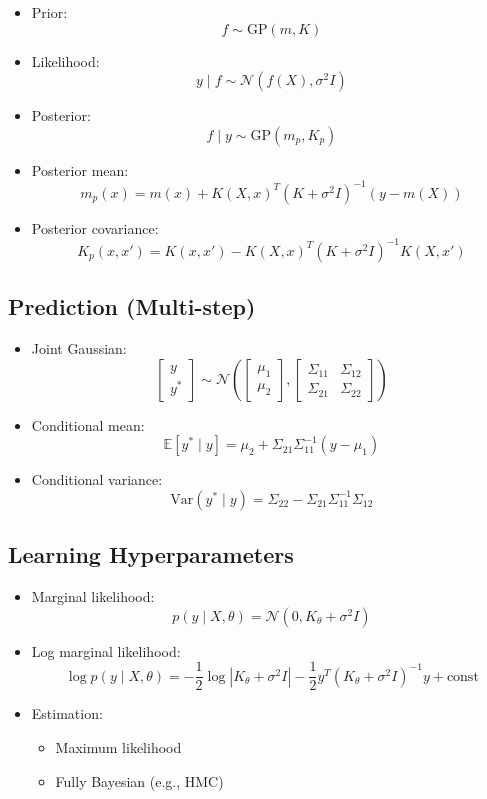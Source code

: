 \documentclass[12pt,oneside]{book}
\numberwithin{equation}{section}
\theoremstyle{definition}
\theoremstyle{plain}
\theoremstyle{remark}
\begin{document}
\begin{itemize}
\item Prior:
\[
f \sim \mathrm{GP}(m, K)
\]

\item Likelihood:
\[
y \mid f \sim \mathcal{N}(f(X), \sigma^2 I)
\]

\item Posterior:
\[
f \mid y \sim \mathrm{GP}(m_p, K_p)
\]

\item Posterior mean:
\[
m_p(x) = m(x) + K(X,x)^T (K + \sigma^2 I)^{-1}(y - m(X))
\]

\item Posterior covariance:
\[
K_p(x,x') = K(x,x') - K(X,x)^T (K + \sigma^2 I)^{-1} K(X,x')
\]
\end{itemize}

\subsection{Prediction (Multi-step)}

\begin{itemize}
\item Joint Gaussian:
\[
\begin{bmatrix} y \\ y^* \end{bmatrix}
\sim \mathcal{N}
\left(
\begin{bmatrix} \mu_1 \\ \mu_2 \end{bmatrix},
\begin{bmatrix} \Sigma_{11} & \Sigma_{12} \\ \Sigma_{21} & \Sigma_{22} \end{bmatrix}
\right)
\]

\item Conditional mean:
\[
\mathbb{E}[y^* \mid y] = \mu_2 + \Sigma_{21}\Sigma_{11}^{-1}(y - \mu_1)
\]

\item Conditional variance:
\[
\mathrm{Var}(y^* \mid y) = \Sigma_{22} - \Sigma_{21}\Sigma_{11}^{-1}\Sigma_{12}
\]
\end{itemize}

\subsection{Learning Hyperparameters}

\begin{itemize}
\item Marginal likelihood:
\[
p(y \mid X, \theta) = \mathcal{N}(0, K_\theta + \sigma^2 I)
\]

\item Log marginal likelihood:
\[
\log p(y \mid X, \theta)
=
-\frac{1}{2}\log |K_\theta + \sigma^2 I|
-\frac{1}{2} y^T (K_\theta + \sigma^2 I)^{-1} y
+ \text{const}
\]

\item Estimation:
\begin{itemize}
\item Maximum likelihood
\item Fully Bayesian (e.g., HMC)
\end{itemize}
\end{itemize}
\end{document}
